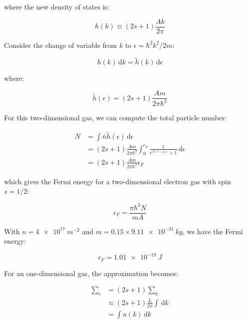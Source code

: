 \documentclass[12pt]{article}
\begin{document}
where the new density of states is:

\begin{equation}
    h(k) \equiv (2s + 1) \frac{Ak}{2\pi}
\end{equation}

Consider the change of variable from $k$ to $\epsilon = \hbar^{2} k^{2}/2m$:

\begin{equation}
    h(k) \, \mathrm{d}k = \tilde{h}(k) \, \mathrm{d}\epsilon
\end{equation}

where:

\begin{equation}
    \tilde{h}(\epsilon) = (2s + 1) \frac{Am}{2\pi\hbar^{2}}
\end{equation}

For this two-dimensional gas, we can compute the total particle number:

\begin{equation}
    \begin{split}
        N &= \int \bar{n} \tilde{h}(\epsilon) \, \mathrm{d}\epsilon \\
        &= (2s + 1) \frac{Am}{2\pi\hbar^{2}} \int_{0}^{\epsilon_{F}} \frac{1}{e^{\beta (\epsilon - \mu)} + 1} \, \mathrm{d}\epsilon \\
        &= (2s + 1) \frac{Am}{2\pi\hbar^{2}} \epsilon_{F}
    \end{split}
\end{equation}

which gives the Fermi energy for a two-dimensional electron gas with spin $s = 1/2$:

\begin{equation}
    \epsilon_{F} = \frac{\pi\hbar^{2} N}{m A}
\end{equation}

With $n = \qty{4e17}{m^{-2}}$ and $m = 0.15 \times \qty{9.11e-31}{kg}$, we have the Fermi energy:

\begin{equation}
    \epsilon_{F} = \qty{1.01e-19}{J}
\end{equation}

For an one-dimensional gas, the approximation becomes:

\begin{equation}
    \begin{split}
        \sum_{i} &= (2s + 1) \sum_{k} \\
        &\approx (2s + 1) \frac{L}{2\pi} \int \, \mathrm{d}k \\
        &= \int u(k) \, \mathrm{d}k
    \end{split}
\end{equation}
\end{document}

